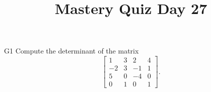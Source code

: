 \documentclass{sbgLAquiz}
\title{Mastery Quiz Day 27 }
\begin{document}
\begin{problem}{G1}
Compute the determinant of the matrix
\[
  \begin{bmatrix}
    1 & 3 & 2 & 4 \\
    -2 & 3 & -1 & 1 \\
    5 & 0 & -4 & 0 \\
    0 & 1 & 0 & 1
  \end{bmatrix}
.\]
\end{problem}
\end{document}

